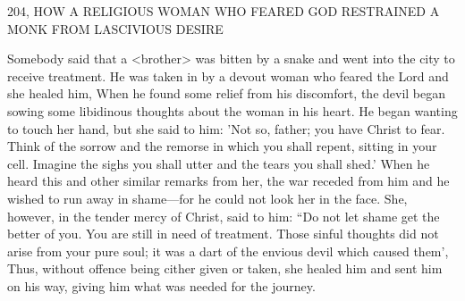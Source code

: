 204, HOW A RELIGIOUS WOMAN
WHO FEARED GOD RESTRAINED A MONK
FROM LASCIVIOUS DESIRE

Somebody said that a <brother> was bitten by a snake and went
into the city to receive treatment.
He was taken in by a devout
woman who feared the Lord and she healed him, When he found
some relief from his discomfort, the devil began sowing some
libidinous thoughts about the woman in his heart.
He began
wanting to touch her hand, but she said to him: 'Not so, father; you
have Christ to fear.
Think of the sorrow and the remorse in which
you shall repent, sitting in your cell.
Imagine the sighs you shall
utter and the tears you shall shed.' When he heard this and other
similar remarks from her, the war receded from him and he wished
to run away in shame—for he could not look her in the face.
She,
however, in the tender mercy of Christ, said to him: “Do not let
shame get the better of you.
You are still in need of treatment.
Those sinful thoughts did not arise from your pure soul; it was a
dart of the envious devil which caused them', Thus, without offence
being cither given or taken, she healed him and sent him on his
way, giving him what was needed for the journey.

